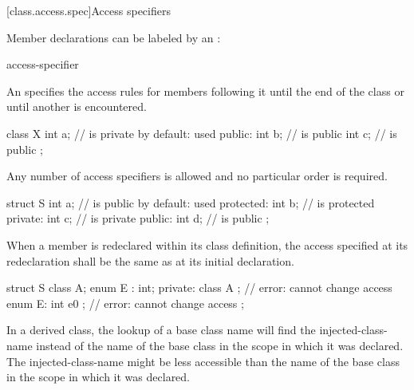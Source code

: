 [class.access.spec]{Access specifiers}%

\pnum
Member declarations can be labeled by an
:

\begin{ncsimplebnf}
access-specifier \terminal{:} 
\end{ncsimplebnf}

An
specifies the access rules for members following it
until the end of the class or until another
is encountered.
\begin{example}
\begin{codeblock}
class X {
  int a;            //  is private by default:  used
public:
  int b;            //  is public
  int c;            //  is public
};
\end{codeblock}
\end{example}

\pnum
Any number of access specifiers is allowed and no particular order is required.
\begin{example}
\begin{codeblock}
struct S {
  int a;            //  is public by default:  used
protected:
  int b;            //  is protected
private:
  int c;            //  is private
public:
  int d;            //  is public
};
\end{codeblock}
\end{example}

\pnum
When a member is redeclared within its class definition,
the access specified at its redeclaration shall
be the same as at its initial declaration.
\begin{example}
\begin{codeblock}
struct S {
  class A;
  enum E : int;
private:
  class A { };                  // error: cannot change access
  enum E: int { e0 };           // error: cannot change access
};
\end{codeblock}
\end{example}

\pnum
\begin{note}
In a derived class, the lookup of a base class name will find the
injected-class-name instead of the name of the base class in the scope
in which it was declared. The injected-class-name might be less accessible
than the name of the base class in the scope in which it was declared.
\end{note}

